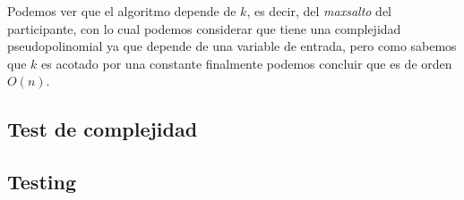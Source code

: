 Podemos ver que el algoritmo depende de $k$, es decir, del \textit{maxsalto} del participante, con lo cual podemos considerar que tiene una complejidad pseudopolinomial ya que depende de una variable de entrada, pero como sabemos que $k$ es acotado por una constante finalmente podemos concluir que es de orden $O(n)$.

\subsection{Test de complejidad}

\subsection{Testing}
